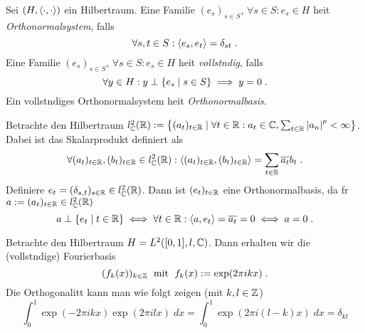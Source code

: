 \begin{definition}
	Sei \((H, \left\langle\cdot, \cdot\right\rangle)\) ein Hilbertraum. Eine Familie \((e_s)_{s\in S}\), \(\forall s \in S: e_s \in H\) hei\s t \textit{Orthonormalsystem}, falls
	\[\forall s, t \in S: \left\langle e_s, e_t\right\rangle = \delta_{st}\;.\]
	Eine Familie \((e_s)_{s\in S}\), \(\forall s \in S: e_s \in H\) hei\s t \textit{vollst\as ndig}, falls 
	\[\forall y \in H: y \perp \left\{e_s \;\vert\; s \in S\right\} \implies y = 0\;.\]
	Ein vollst\as ndiges Orthonormalsystem hei\s t \textit{Orthonormalbasis}.
\end{definition}

\begin{ex}
	Betrachte den Hilbertraum \(l^2_{\mathbb{C}}(\mathbb{R}): = \left\{(a_t)_{t\in\mathbb{R}} \;\vert\; \forall t\in \mathbb{R}: a_t \in \mathbb{C}, \sum_{t\in \mathbb{R}} \left\lvert a_n \right\rvert^p < \infty\right\}\). Dabei ist das Skalarprodukt definiert als
	\[\forall (a_t)_{t\in\mathbb{R}}, (b_t)_{t\in\mathbb{R}} \in l^2_{\mathbb{C}}(\mathbb{R}): \left\langle(a_t)_{t\in\mathbb{R}},(b_t)_{t\in\mathbb{R}}\right\rangle = \sum_{t\in\mathbb{R}} \overline{a_t} b_t\;.\]
	Definiere \(e_t = (\delta_{s,t})_{s\in\mathbb{R}}\in l^2_{\mathbb{C}}(\mathbb{R})\). Dann ist \((e_t)_{t\in\mathbb{R}}\) eine Orthonormalbasis, da f\us r \(a:=(a_t)_{t\in\mathbb{R}} \in l^2_{\mathbb{C}}(\mathbb{R})\)
	\[a \perp \left\{e_t\;\vert\;t\in\mathbb{R}\right\} \iff \forall t \in \mathbb{R}: \left\langle a,e_t\right\rangle = \overline{a_t} = 0 \iff a = 0\;.\]
\end{ex}

\begin{ex}
	Betrachte den Hilbertraum \(H = L^2([0,1], l, \mathbb{C})\). Dann erhalten wir die (vollst\as ndige) Fourierbasis
	\[(f_k(x))_{k\in\mathbb{Z}} \;\text{ mit }\; f_k(x) := \exp(2\pi i kx) \;.\]
	Die Orthogonalit\as t kann man wie folgt zeigen (mit \(k, l \in \mathbb{Z}\))
	\[\int_0^1 \exp(-2\pi i  k x)\exp(2\pi i l x)\;dx = \int_0^1 \exp(2\pi i (l-k)x) \;dx = \delta_{kl}\]
\end{ex}

